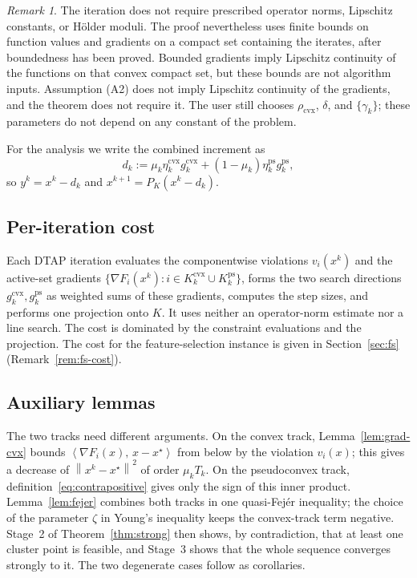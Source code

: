 \documentclass[]{interact}
\theoremstyle{plain}
\theoremstyle{definition}
\theoremstyle{remark}
\newtheorem{remark}{Remark}
\newcommand{\norm}[1]{\left\lVert #1 \right\rVert}
\newcommand{\inner}[2]{\left\langle #1,\, #2 \right\rangle}
\newcommand{\cvx}{\mathrm{cvx}}
\newcommand{\ps}{\mathrm{ps}}
\newcommand{\dtap}{\textsc{DTAP}}
\begin{document}
\begin{remark}\label{rem:regularity-scope}
The iteration does not require prescribed operator norms, Lipschitz constants, or
H\"older moduli. The proof nevertheless uses finite bounds on function values and
gradients on a compact set containing the iterates, after boundedness has been proved.
Bounded gradients imply Lipschitz continuity of the functions on that convex compact set,
but these bounds are not algorithm inputs. Assumption (A2) does not
imply Lipschitz continuity of the gradients, and the theorem does not require it.
The user still chooses $\rho_{\cvx}$, $\delta$, and $\{\gamma_k\}$; these parameters do not
depend on any constant of the problem.
\end{remark}

For the analysis we write the combined increment as
\begin{equation}\label{eq:dk}
d_k:=\mu_k\eta^{\cvx}_k g^{\cvx}_k+(1-\mu_k)\eta^{\ps}_k g^{\ps}_k,
\end{equation}
so $y^k=x^k-d_k$ and $x^{k+1}=P_K(x^k-d_k)$.
\subsection{Per-iteration cost}\label{ssec:complexity}
Each \dtap{} iteration evaluates the
componentwise violations $v_i(x^k)$ and the active-set gradients $\{\nabla F_i(x^k):i\in
K^{\cvx}_k\cup K^{\ps}_k\}$, forms the two search directions $g^{\cvx}_k,g^{\ps}_k$ as weighted
sums of these gradients, computes the step sizes, and performs one projection onto $K$.
It uses neither an operator-norm estimate nor a line search. The cost is dominated by
the constraint evaluations and the projection. The cost for the feature-selection instance
is given in Section~\ref{sec:fs}
(Remark~\ref{rem:fs-cost}).

\subsection{Auxiliary lemmas}\label{ssec:aux}
The two tracks need different arguments. On the convex track, Lemma~\ref{lem:grad-cvx} bounds
$\inner{\nabla F_i(x)}{x-x^\star}$ from below by the violation $v_i(x)$; this gives a decrease of
$\norm{x^k-x^\star}^2$ of order $\mu_kT_k$. On the pseudoconvex track,
definition~\eqref{eq:contrapositive} gives only the sign of this inner product.
Lemma~\ref{lem:fejer} combines both tracks in one quasi-Fej\'er inequality; the choice of the
parameter $\zeta$ in Young's inequality keeps the convex-track term negative. Stage~2 of
Theorem~\ref{thm:strong} then shows, by contradiction, that at least one cluster point is
feasible, and Stage~3 shows that the whole sequence converges strongly to it. The two degenerate cases
follow as corollaries.
\end{document}
